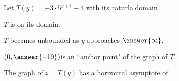 \documentclass{ximera}
\author{Lee Wayand}
\begin{document}
\begin{exercise}




Let $T(y) = -3 \cdot 5^{y+1} - 4$ with its naturla domain.


\begin{question}


$T$ is  on its domain. \\


\end{question}







\begin{question}


$T$ becomes unbounded as $y$ approaches $\answer{\infty}$.


\end{question}





\begin{question}


$\left( 0, \answer{-19} \right) $is an ``anchor point" of the graph of $T$. \\


\end{question}








\begin{question}


The graph of $z=T(y)$ has a horizontal asymptote of

\begin{multipleChoice}
\end{multipleChoice}


\end{question}








\end{exercise}
\end{document}
